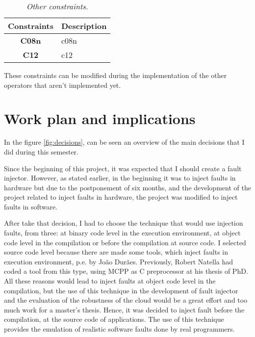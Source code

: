 \begin{table}[!ht]
\centering
\begin{tabular}{|c|p{12cm}|}
\hline
\textbf{Constraints}            & \multicolumn{1}{c|}{\textbf{Description}}                                     \\ \hline \hline
\textbf{C08n}         & \Acl{c08n} \\ \hline
\textbf{C12}         & \Acl{c12} \\ \hline
\end{tabular}
\caption{\small \sl Other constraints.\label{tab:otherConstraints}}
\end{table}

These constraints can be modified during the implementation of the other operators that aren't implemented yet.

\clearpage
\section{Work plan and implications}

In the figure \ref{fig:decisions}, can be seen an overview of the main decisions that I did during this semester.

Since the beginning of this project, it was expected that I should create a fault injector. However, as stated earlier, in the beginning it was to inject faults in hardware but due to the postponement of six months, and the development of the project related to inject faults in hardware, the project was modified to inject faults in software.

After take that decision, I had to choose the technique that would use injection faults, from three: at binary code level in the execution environment, at object code level in the compilation or before the compilation at source code. I selected source code level because there are made some tools, which inject faults in execution environment, p.e. by João Durães. Previously, Robert Natella had coded a tool from this type, using MCPP as C preprocessor at his thesis of PhD.
All these reasons would lead to inject faults at object code level in the compilation, but the use of this technique in the development of fault injector and the evaluation of the robustness of the cloud would be a great effort and too much work for a master's thesis. Hence, it was decided to inject fault before the compilation, at the source code of applications. The use of this technique provides the emulation of realistic software faults done by real programmers.

